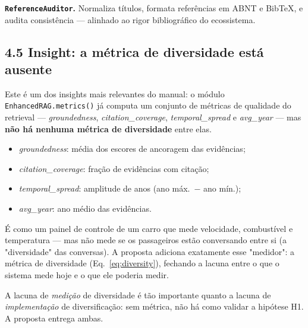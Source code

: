 \noindent\textbf{\texttt{ReferenceAuditor}.} Normaliza títulos, formata
referências em ABNT e BibTeX, e audita consistência — alinhado ao rigor
bibliográfico do ecossistema.

\subsection*{4.5 Insight: a métrica de diversidade está ausente}

 Este é um dos insights mais relevantes do manual: o módulo
\texttt{EnhancedRAG.metrics()} já computa um conjunto de métricas de qualidade do
retrieval --- \emph{groundedness}, \emph{citation\_coverage},
\emph{temporal\_spread} e \emph{avg\_year} --- mas \textbf{não há nenhuma métrica
de diversidade} entre elas.

\begin{itemize}
  \item \emph{groundedness}: média dos escores de ancoragem das evidências;
  \item \emph{citation\_coverage}: fração de evidências com citação;
  \item \emph{temporal\_spread}: amplitude de anos (ano máx.\ $-$ ano mín.);
  \item \emph{avg\_year}: ano médio das evidências.
\end{itemize}

\begin{intuicao}
É como um painel de controle de um carro que mede velocidade, combustível e
temperatura --- mas não mede se os passageiros estão conversando entre si (a
"diversidade" das conversas). A proposta adiciona exatamente esse "medidor": a
métrica de diversidade (Eq.~\ref{eq:diversity}), fechando a lacuna entre o que o
sistema mede hoje e o que ele poderia medir.
\end{intuicao}

\begin{pontochave}
A lacuna de \emph{medição} de diversidade é tão importante quanto a lacuna de
\emph{implementação} de diversificação: sem métrica, não há como validar a
hipótese H1. A proposta entrega ambas.
\end{pontochave}
